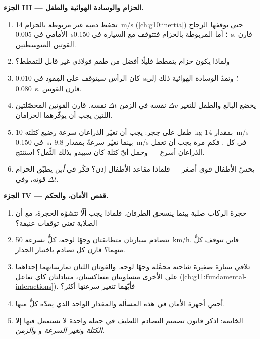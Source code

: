\begin{problem}
\medskip
\noindent\textbf{الجزء III --- الحزام والوسادة الهوائية والطفل.}
\begin{enumerate}[resume]
  \item تحفظ دمية غير مربوطة بالحزام \qty{14}{m/s} (\cref{ch:g10:inertia})
        حتى يوقفها الزجاج الأمامي في \qty{0.005}{s}؛ أما المربوطة بالحزام
        فتتوقف مع السيارة في \qty{0.150}{s}. قارن القوتين المتوسطتين.
  \item ولماذا يكون حزام يتمطط قليلًا أفضل من
        طقم فولاذي غير قابل للتمطط؟
  \item كان الرأس سيتوقف على المِقود في \qty{0.010}{s}؛ وتمدّ الوسادة الهوائية
        ذلك إلى \qty{0.080}{s}. قارن القوتين.
  \item يخضع البالغ والطفل للتغير $\Delta v$ نفسه في الزمن $\Delta t$
        نفسه. قارن القوتين المحصّلتين اللتين يجب أن يوفّرهما الحزامان.
  \item طفل على حِجر: يجب أن تغيّر الذراعان سرعة رضيع كتلته \qty{10}{kg}
        بمقدار \qty{14}{m/s} في \qty{0.150}{s}، بينما تغيّر 
        سرعةً بمقدار \qty{9.8}{m/s} في كل . فكم مرة يجب أن تعمل
        الذراعان أسرع --- وحمل أيّ كتلة كان سيبدو بذلك الثِّقل؟
        استنتج.
  \item يحسّ الأطفال قوى أصغر --- فلماذا مقاعد الأطفال إذن؟ فكّر في
        \emph{أين} يطبّق الحزام قوته، وفي $\Delta t$.
\end{enumerate}

\medskip
\noindent\textbf{الجزء IV --- قفص الأمان، والحكم.}
\begin{enumerate}[resume]
  \item حجرة الركاب صلبة بينما ينسحق الطرفان. فلماذا يجب ألّا
        تتشوّه الحجرة، مع أن الصلابة تعني توقفات عنيفة؟
  \item تتصادم سيارتان متطابقتان وجهًا لوجه، كلٌّ بسرعة \qty{50}{km/h}.
        فأين تتوقف كلٌّ منهما؟ قارن كل تصادم باختبار الجدار.
  \item تلاقي سيارة صغيرة شاحنة محمَّلة وجهًا لوجه. والقوتان اللتان تمارسانهما
        إحداهما على الأخرى متساويتان متعاكستان، متبادلتان كأي تفاعل
        (\cref{ch:g11:fundamental-interactions}). فأيّهما تتغير سرعتها
        أكثر؟
  \item أحصِ أجهزة الأمان في هذه المسألة والمقدار الواحد
        الذي يمدّه كلٌّ منها.
  \item الخاتمة: اذكر قانون تصميم التصادم اللطيف في جملة
        واحدة لا تستعمل فيها إلا \emph{الكتلة} و\emph{تغير السرعة}
        و\emph{} و\emph{الزمن}.
\end{enumerate}
\end{problem}
